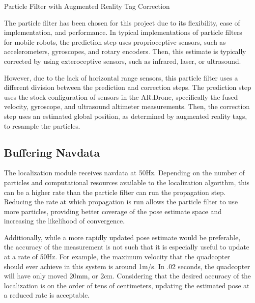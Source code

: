 	\begin{algorithm}
		\centering
		\caption{Particle Filter with Augmented Reality Tag Correction} 
		\begin{algorithmic}[1]
				\EndIf
					 
				\EndIf
			\EndFor
		\end{algorithmic}
	\end{algorithm}

	The particle filter has been chosen for this project due to its flexibility, ease of implementation, and performance. In typical implementations of particle filters for mobile robots, the prediction step uses proprioceptive sensors, such as accelerometers, gyroscopes, and rotary encoders. Then, this estimate is typically corrected by using exteroceptive sensors, such as infrared, laser, or ultrasound.

	However, due to the lack of horizontal range sensors, this particle filter uses a different division between the prediction and correction steps. The prediction step uses the stock configuration of sensors in the AR.Drone, specifically the fused velocity, gyroscope, and ultrasound altimeter measurements. Then, the correction step uses an estimated global position, as determined by augmented reality tags, to resample the particles.


	\subsection{Buffering Navdata}

		The localization module receives navdata at 50Hz. Depending on the number of particles and computational resources available to the localization algorithm, this can be a higher rate than the particle filter can run the propagation step. Reducing the rate at which propagation is run allows the particle filter to use more particles, providing better coverage of the pose estimate space and increasing the likelihood of convergence.

		Additionally, while a more rapidly updated pose estimate would be preferable, the accuracy of the measurement is not such that it is especially useful to update at a rate of 50Hz. For example, the maximum velocity that the quadcopter should ever achieve in this system is around 1m/s. In .02 seconds, the quadcopter will have only moved 20mm, or 2cm. Considering that the desired accuracy of the localization is on the order of tens of centimeters, updating the estimated pose at a reduced rate is acceptable.

